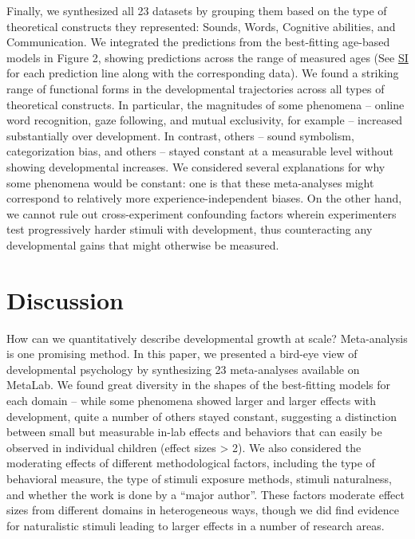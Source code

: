 \documentclass[10pt, letterpaper]{article}
\begin{document}
Finally, we synthesized all 23 datasets by grouping them based on the
type of theoretical constructs they represented: Sounds, Words,
Cognitive abilities, and Communication. We integrated the predictions
from the best-fitting age-based models in Figure 2, showing predictions
across the range of measured ages (See
\href{https://github.com/anjiecao/metalab_CogSci2023/blob/main/writing/SI.pdf}{SI}
for each prediction line along with the corresponding data). We found a
striking range of functional forms in the developmental trajectories
across all types of theoretical constructs. In particular, the
magnitudes of some phenomena -- online word recognition, gaze following,
and mutual exclusivity, for example -- increased substantially over
development. In contrast, others -- sound symbolism, categorization
bias, and others -- stayed constant at a measurable level without
showing developmental increases. We considered several explanations for
why some phenomena would be constant: one is that these meta-analyses
might correspond to relatively more experience-independent biases. On
the other hand, we cannot rule out cross-experiment confounding factors
wherein experimenters test progressively harder stimuli with
development, thus counteracting any developmental gains that might
otherwise be measured.

\hypertarget{discussion}{%
\section{Discussion}\label{discussion}}

How can we quantitatively describe developmental growth at scale?
Meta-analysis is one promising method. In this paper, we presented a
bird-eye view of developmental psychology by synthesizing 23
meta-analyses available on MetaLab. We found great diversity in the
shapes of the best-fitting models for each domain -- while some
phenomena showed larger and larger effects with development, quite a
number of others stayed constant, suggesting a distinction between small
but measurable in-lab effects and behaviors that can easily be observed
in individual children (effect sizes \textgreater{} 2). We also
considered the moderating effects of different methodological factors,
including the type of behavioral measure, the type of stimuli exposure
methods, stimuli naturalness, and whether the work is done by a ``major
author''. These factors moderate effect sizes from different domains in
heterogeneous ways, though we did find evidence for naturalistic stimuli
leading to larger effects in a number of research areas.
\end{document}
